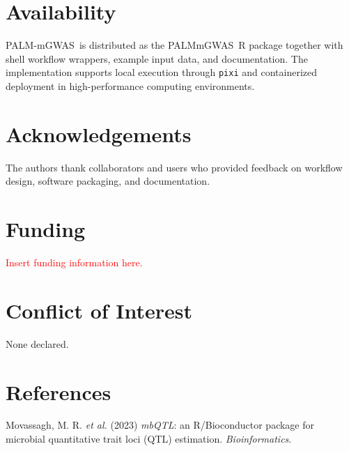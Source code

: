 \documentclass[10pt,twocolumn]{article}
\newcommand{\software}{PALM-mGWAS}
\newcommand{\pkgname}{PALMmGWAS}
\newcommand{\todoentry}[1]{\textcolor{red}{#1}}
\begin{document}
\section{Availability}
\software\ is distributed as the \pkgname\ R package together with shell workflow wrappers, example input data, and documentation. The implementation supports local execution through \texttt{pixi} and containerized deployment in high-performance computing environments.

\section*{Acknowledgements}
The authors thank collaborators and users who provided feedback on workflow design, software packaging, and documentation.

\section*{Funding}
\todoentry{Insert funding information here.}

\section*{Conflict of Interest}
None declared.

\section*{References}

Movassagh, M. R. \textit{et al.} (2023)
\textit{mbQTL}: an R/Bioconductor package for microbial quantitative trait loci (QTL) estimation.
\textit{Bioinformatics}.
\end{document}
